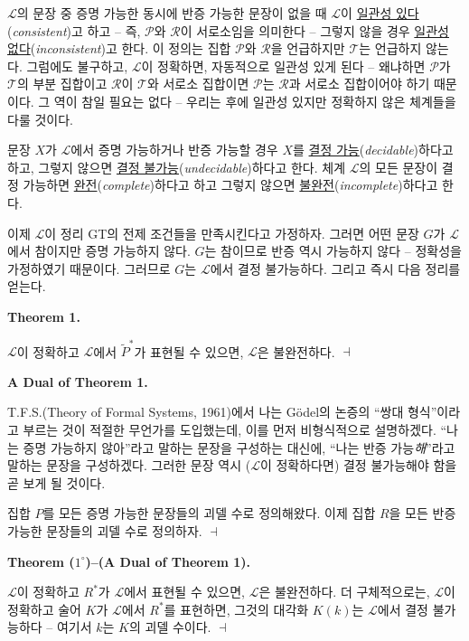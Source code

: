 \documentclass[12pt]{paper}
\newenvironment{context}[1][]
{ \noindent \textbf{{#1}.}
}
{ \hfill $ \dashv $
}
\begin{document}
  $\mathcal{L}$의 문장 중 증명 가능한 동시에 반증 가능한 문장이 없을 때 $\mathcal{L}$이 \underline{일관성 있다}(\textit{consistent})고 하고 --
  즉, $\mathcal{P}$와 $\mathcal{R}$이 서로소임을 의미한다 --
  그렇지 않을 경우 \underline{일관성 없다}(\textit{inconsistent})고 한다.
  이 정의는 집합 $\mathcal{P}$와 $\mathcal{R}$을 언급하지만 $\mathcal{T}$는 언급하지 않는다.
  그럼에도 불구하고, $\mathcal{L}$이 정확하면, 자동적으로 일관성 있게 된다 --
  왜냐하면 $\mathcal{P}$가 $\mathcal{T}$의 부분 집합이고 $\mathcal{R}$이 $\mathcal{T}$와 서로소 집합이면 $\mathcal{P}$는 $\mathcal{R}$과 서로소 집합이어야 하기 때문이다.
  그 역이 참일 필요는 없다 --
  우리는 후에 일관성 있지만 정확하지 않은 체계들을 다룰 것이다.
  
  문장 $X$가 $\mathcal{L}$에서 증명 가능하거나 반증 가능할 경우 $X$를 \underline{결정 가능}(\textit{decidable})하다고 하고,
  그렇지 않으면 \underline{결정 불가능}(\textit{undecidable})하다고 한다.
  체계 $\mathcal{L}$의 모든 문장이 결정 가능하면 \underline{완전}(\textit{complete})하다고 하고 그렇지 않으면 \underline{불완전}(\textit{incomplete})하다고 한다.

  이제 $\mathcal{L}$이 정리 GT의 전제 조건들을 만족시킨다고 가정하자.
  그러면 어떤 문장 $G$가 $\mathcal{L}$에서 참이지만 증명 가능하지 않다.
  $G$는 참이므로 반증 역시 가능하지 않다 --
  정확성을 가정하였기 때문이다.
  그러므로 $G$는 $\mathcal{L}$에서 결정 불가능하다.
  그리고 즉시 다음 정리를 얻는다.

  \begin{context}[Theorem 1]
    $\mathcal{L}$이 정확하고 $\mathcal{L}$에서 $\tilde{P}^{*}$가 표현될 수 있으면,
    $\mathcal{L}$은 불완전하다.
  \end{context}

  \begin{context}[A Dual of Theorem 1]
    T.F.S.(Theory of Formal Systems, 1961)에서 나는 G\"odel의 논증의 ``쌍대 형식''이라고 부르는 것이 적절한 무언가를 도입했는데,
    이를 먼저 비형식적으로 설명하겠다.
    ``나는 증명 가능하지 않아''라고 말하는 문장을 구성하는 대신에,
    ``나는 반증 가능\textit{해}''라고 말하는 문장을 구성하겠다.
    그러한 문장 역시 ($\mathcal{L}$이 정확하다면) 결정 불가능해야 함을 곧 보게 될 것이다.

    집합 $P$를 모든 증명 가능한 문장들의 괴델 수로 정의해왔다.
    이제 집합 $R$을 모든 반증 가능한 문장들의 괴델 수로 정의하자.
  \end{context}

  \begin{context}[Theorem ($1^{\circ}$)--(A Dual of Theorem 1)]
    $\mathcal{L}$이 정확하고 $R^{*}$가 $\mathcal{L}$에서 표현될 수 있으면,
    $\mathcal{L}$은 불완전하다.
    더 구체적으로는, $\mathcal{L}$이 정확하고 술어 $K$가 $\mathcal{L}$에서 $R^{*}$를 표현하면,
    그것의 대각화 $K \left( k \right)$는 $\mathcal{L}$에서 결정 불가능하다 --
    여기서 $k$는 $K$의 괴델 수이다.
  \end{context}
\end{document}
